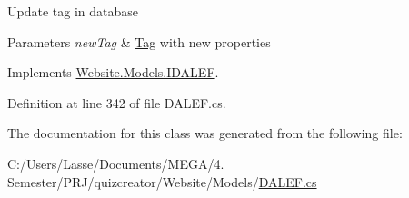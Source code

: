Update tag in database 


\begin{DoxyParams}{Parameters}
{\em new\+Tag} & \hyperlink{class_website_1_1_models_1_1_tag}{Tag} with new properties\\
\hline
\end{DoxyParams}


Implements \hyperlink{interface_website_1_1_models_1_1_i_d_a_l_e_f_a554f86389b02c2f8abb446053c74b9f2}{Website.\+Models.\+I\+D\+A\+L\+E\+F}.



Definition at line 342 of file D\+A\+L\+E\+F.\+cs.



The documentation for this class was generated from the following file\+:\begin{DoxyCompactItemize}
\item 
C\+:/\+Users/\+Lasse/\+Documents/\+M\+E\+G\+A/4. Semester/\+P\+R\+J/quizcreator/\+Website/\+Models/\hyperlink{_d_a_l_e_f_8cs}{D\+A\+L\+E\+F.\+cs}\end{DoxyCompactItemize}

